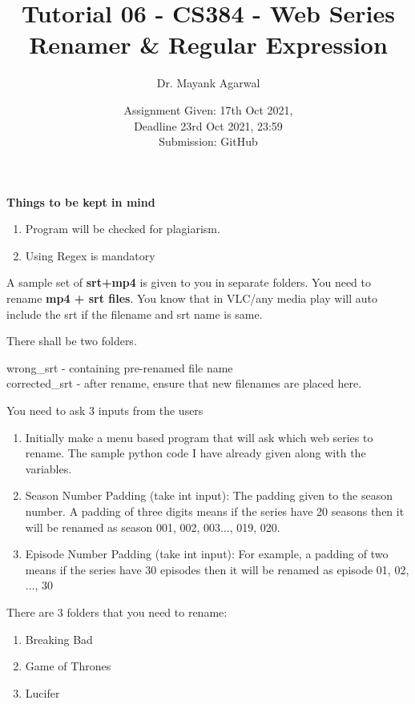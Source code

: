 \documentclass[12pt,  letterpaper,  twoside]{article}
\title{Tutorial 06 - CS384 -  Web Series Renamer \& Regular Expression}
\author{Dr. Mayank Agarwal}
\date{Assignment Given: 17th Oct 2021,\\ Deadline 23rd Oct 2021,  
	23:59\\Submission: GitHub }
\begin{document}
	\maketitle  
	\textbf{Things to be kept in mind}\\
	\begin{enumerate}
		\item Program will be checked for plagiarism.   
		\item Using Regex is mandatory
		
	\end{enumerate}
	
	A sample set of \textbf{srt+mp4} is given to you in separate folders. You 
	need to rename \textbf{mp4 + srt files}. You know that in VLC/any media 
	play will auto include the srt if the filename and srt name is same. 
	
	There shall be two folders.
	
	wrong\_srt - containing pre-renamed file name \\
	corrected\_srt - after rename, ensure that new filenames are placed here. 
	
	You 
	need to ask 3 inputs from the users
	
	\begin{enumerate}
		\item Initially make a menu based program that will ask which web 
		series to 
		rename. The sample python code I have already given along with the 
		variables.
		\item Season Number Padding (take int input): The padding given to the 
		season number.  A padding of three digits means if the series have 20 
		seasons then it will be renamed as season 001, 002, 003..., 019, 020.
		\item Episode Number Padding (take int input): For example,  a padding 
		of two means if the series have 30 episodes then it will be renamed as 
		episode 01, 02, ..., 30
	\end{enumerate}
	
	There are 3 folders that you need to rename:
	\begin{enumerate}

\item  Breaking Bad
\item   Game of Thrones
\item 	Lucifer

	\end{enumerate}
	
\end{document}
